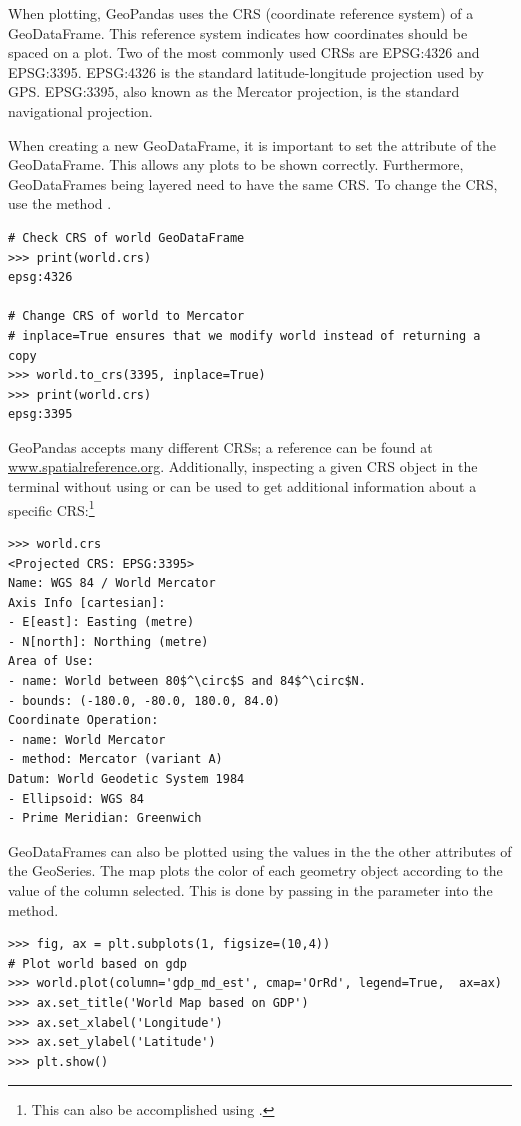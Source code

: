When plotting, GeoPandas uses the CRS (coordinate reference system) of a GeoDataFrame.
This reference system indicates how coordinates should be spaced on a plot.
Two of the most commonly used CRSs are EPSG:4326 and EPSG:3395.
EPSG:4326 is the standard latitude-longitude projection used by GPS.
EPSG:3395, also known as the Mercator projection, is the standard navigational projection.

When creating a new GeoDataFrame, it is important to set the  attribute of the GeoDataFrame.
This allows any plots to be shown correctly.
Furthermore, GeoDataFrames being layered need to have the same CRS.
To change the CRS, use the method .

\begin{lstlisting}
# Check CRS of world GeoDataFrame
>>> print(world.crs)
epsg:4326

# Change CRS of world to Mercator
# inplace=True ensures that we modify world instead of returning a copy
>>> world.to_crs(3395, inplace=True)
>>> print(world.crs)
epsg:3395
\end{lstlisting}

GeoPandas accepts many different CRSs; a reference can be found at \url{www.spatialreference.org}.
Additionally, inspecting a given CRS object in the terminal without using  or  can be used to get additional information about a specific CRS:\footnote{This can also be accomplished using .}
\begin{lstlisting}[mathescape]
>>> world.crs
<Projected CRS: EPSG:3395>
Name: WGS 84 / World Mercator
Axis Info [cartesian]:
- E[east]: Easting (metre)
- N[north]: Northing (metre)
Area of Use:
- name: World between 80$^\circ$S and 84$^\circ$N.
- bounds: (-180.0, -80.0, 180.0, 84.0)
Coordinate Operation:
- name: World Mercator
- method: Mercator (variant A)
Datum: World Geodetic System 1984
- Ellipsoid: WGS 84
- Prime Meridian: Greenwich
\end{lstlisting}

GeoDataFrames can also be plotted using the values in the the other attributes of the GeoSeries.
The map plots the color of each geometry object according to the value of the column selected.
This is done by passing in the parameter  into the  method.

\begin{lstlisting}
>>> fig, ax = plt.subplots(1, figsize=(10,4))
# Plot world based on gdp
>>> world.plot(column='gdp_md_est', cmap='OrRd', legend=True,  ax=ax)
>>> ax.set_title('World Map based on GDP')
>>> ax.set_xlabel('Longitude')
>>> ax.set_ylabel('Latitude')
>>> plt.show()
\end{lstlisting}


